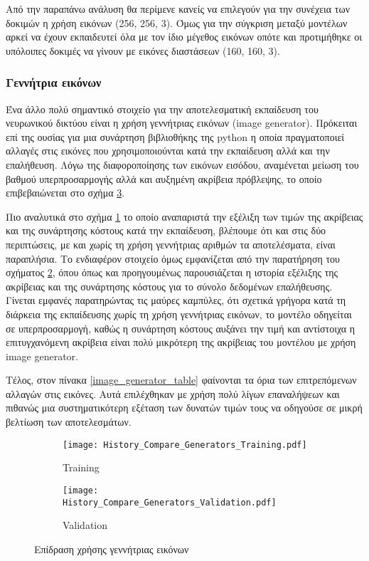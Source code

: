 Από την παραπάνω ανάλυση θα περίμενε κανείς να επιλεγούν για την συνέχεια των δοκιμών η χρήση εικόνων (256, 256, 3). Όμως για την σύγκριση μεταξύ μοντέλων αρκεί να έχουν εκπαιδευτεί όλα με τον ίδιο μέγεθος εικόνων οπότε και προτιμήθηκε οι υπόλοιπες δοκιμές να γίνουν με εικόνες διαστάσεων (160, 160, 3).

\subsubsection{Γεννήτρια εικόνων}

Ένα άλλο πολύ σημαντικό στοιχείο για την αποτελεσματική εκπαίδευση του νευρωνικού δικτύου είναι η χρήση γεννήτριας εικόνων (image generator). Πρόκειται επί της ουσίας για μια συνάρτηση βιβλιοθήκης της python η οποία πραγματοποιεί αλλαγές στις εικόνες που χρησιμοποιούνται κατά την εκπαίδευση αλλά και την επαλήθευση. Λόγω της διαφοροποίησης των εικόνων εισόδου, αναμένεται μείωση του βαθμού υπερπροσαρμογής αλλά και αυξημένη ακρίβεια πρόβλεψης, το οποίο επιβεβαιώνεται στο σχήμα \ref{image_generator_fig}. 

Πιο αναλυτικά στο σχήμα \ref{image_generator_training} το οποίο αναπαριστά την εξέλιξη των τιμών της ακρίβειας και της συνάρτησης κόστους κατά την εκπαίδευση, βλέπουμε ότι και στις δύο περιπτώσεις, με και χωρίς τη χρήση γεννήτριας αριθμών τα αποτελέσματα, είναι παραπλήσια. Το ενδιαφέρον στοιχείο όμως εμφανίζεται από την παρατήρηση του σχήματος \ref{image_generator_validation}, όπου όπως και προηγουμένως παρουσιάζεται η ιστορία εξέλιξης της ακρίβειας και της συνάρτησης κόστους για το σύνολο δεδομένων επαλήθευσης. Γίνεται εμφανές παρατηρώντας τις μαύρες καμπύλες, ότι σχετικά γρήγορα κατά τη διάρκεια της εκπαίδευσης χωρίς τη χρήση γεννήτριας εικόνων, το μοντέλο οδηγείται σε υπερπροσαρμογή, καθώς η συνάρτηση κόστους αυξάνει την τιμή και αντίστοιχα η επιτυγχανόμενη ακρίβεια είναι πολύ μικρότερη της ακρίβειας του μοντέλου με χρήση image generator. 

Τέλος, στον πίνακα \ref{image_generator_table} φαίνονται τα όρια των επιτρεπόμενων αλλαγών στις εικόνες. Αυτά επιλέχθηκαν με χρήση πολύ λίγων επαναλήψεων και πιθανώς μια συστηματικότερη εξέταση των δυνατών τιμών τους να οδηγούσε σε μικρή βελτίωση των αποτελεσμάτων.


\begin{figure}[H]
\centering
\begin{subfigure}[t]{0.49\textwidth}
\texttt{[image: History\_Compare\_Generators\_Training.pdf]}
\caption{Training}
\label{image_generator_training}
\end{subfigure}
\begin{subfigure}[t]{0.49\textwidth}
\texttt{[image: History\_Compare\_Generators\_Validation.pdf]}
\caption{Validation}
\label{image_generator_validation}
\end{subfigure}
\caption{Επίδραση χρήσης γεννήτριας εικόνων}
\label{image_generator_fig}
\end{figure}


